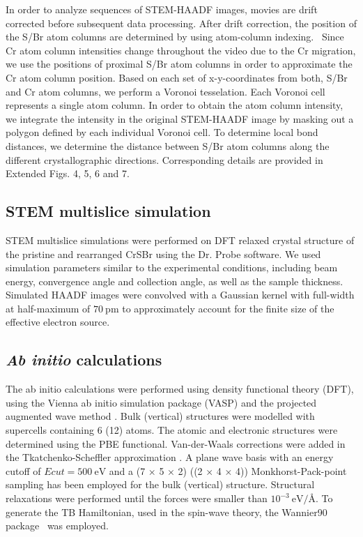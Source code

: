 \documentclass[aps,prl,showpacs,twocolumn,superscriptaddress,floatfix]{revtex4-2}
\begin{document}
In order to analyze sequences of STEM-HAADF images, movies are drift corrected before subsequent data processing. After drift correction, the position of the S/Br atom columns are determined by using atom-column indexing.~\cite{Sang.2014} Since Cr atom column intensities change throughout the video due to the Cr migration, we use the positions of proximal S/Br atom columns in order to approximate the Cr atom column position. Based on each set of x-y-coordinates from both, S/Br and Cr atom columns, we perform a Voronoi tesselation. Each Voronoi cell represents a single atom column. In order to obtain the atom column intensity, we integrate the intensity in the original STEM-HAADF image by masking out a polygon defined by each individual Voronoi cell. To determine local bond distances, we determine the distance between S/Br atom columns along the different crystallographic directions. Corresponding details are provided in Extended Figs. 4, 5, 6 and 7. 

\subsection{STEM multislice simulation}

STEM multislice simulations were performed on DFT relaxed crystal structure of the pristine and rearranged CrSBr using the Dr. Probe software. We used simulation parameters similar to the experimental conditions, including beam energy, convergence angle and collection angle, as well as the sample thickness. Simulated HAADF images were convolved with a Gaussian kernel with full-width at half-maximum of $\SI{70}{\pico\meter}$ to approximately account for the finite size of the effective electron source.

\subsection{\emph{Ab initio} calculations}
The ab initio calculations were performed using density functional theory (DFT), using the Vienna ab initio simulation package (VASP) and the projected augmented wave method \cite{Blochl:94,Kresse:99}. Bulk (vertical) structures were modelled with supercells containing 6 (12) atoms. 
The atomic and electronic structures were determined using the PBE functional. Van-der-Waals corrections were added in the Tkatchenko-Scheffler approximation \cite{Tkatchenko:09}. A plane wave basis with an energy cutoff of $Ecut = \SI{500}{\electronvolt}$ and a (7 × 5 × 2) ((2 × 4 × 4)) Monkhorst-Pack-point sampling has been employed for the bulk (vertical) structure. Structural relaxations were performed until the forces were smaller than $10^{-3}\SI{}{\electronvolt\per\angstrom}$. To generate the TB Hamiltonian, used in the spin-wave theory, the Wannier90 package~\cite{Wannier90} was employed.
\end{document}
